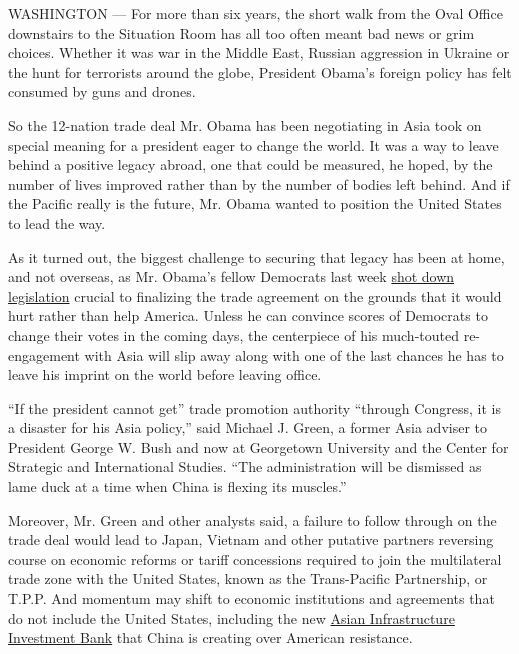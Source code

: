 WASHINGTON --- For more than six years, the short walk from the Oval
Office downstairs to the Situation Room has all too often meant bad news
or grim choices. Whether it was war in the Middle East, Russian
aggression in Ukraine or the hunt for terrorists around the globe,
President Obama's foreign policy has felt consumed by guns and drones.

So the 12-nation trade deal Mr. Obama has been negotiating in Asia took
on special meaning for a president eager to change the world. It was a
way to leave behind a positive legacy abroad, one that could be
measured, he hoped, by the number of lives improved rather than by the
number of bodies left behind. And if the Pacific really is the future,
Mr. Obama wanted to position the United States to lead the way.

As it turned out, the biggest challenge to securing that legacy has been
at home, and not overseas, as Mr. Obama's fellow Democrats last week
\href{http://www.nytimes3xbfgragh.onion/2015/06/13/us/politics/obamas-trade-bills-face-tough-battle-against-house-democrats.html}{shot
down legislation} crucial to finalizing the trade agreement on the
grounds that it would hurt rather than help America. Unless he can
convince scores of Democrats to change their votes in the coming days,
the centerpiece of his much-touted re-engagement with Asia will slip
away along with one of the last chances he has to leave his imprint on
the world before leaving office.

``If the president cannot get'' trade promotion authority ``through
Congress, it is a disaster for his Asia policy,'' said Michael J. Green,
a former Asia adviser to President George W. Bush and now at Georgetown
University and the Center for Strategic and International Studies. ``The
administration will be dismissed as lame duck at a time when China is
flexing its muscles.''

Moreover, Mr. Green and other analysts said, a failure to follow through
on the trade deal would lead to Japan, Vietnam and other putative
partners reversing course on economic reforms or tariff concessions
required to join the multilateral trade zone with the United States,
known as the Trans-Pacific Partnership, or T.P.P. And momentum may shift
to economic institutions and agreements that do not include the United
States, including the new
\href{http://www.nytimes3xbfgragh.onion/2015/04/03/world/asia/china-asian-infrastructure-investment-bank.html}{Asian
Infrastructure Investment Bank} that China is creating over American
resistance.

